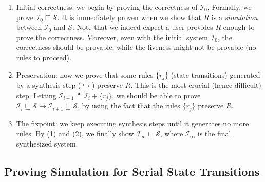 \documentclass[format=manuscript]{acmart}
\begin{document}
\begin{enumerate}
\item Initial correctness: we begin by proving the correctness of
  $\mathcal{I}_0$. Formally, we prove $\mathcal{I}_0 \sqsubseteq
  \mathcal{S}$. It is immediately proven when we show that $R$ is a
  \emph{simulation} between $\mathcal{I}_0$ and $\mathcal{S}$. Note that we
  indeed expect a user provides $R$ enough to prove the correctness. Moreover,
  even with the initial system $\mathcal{I}_0$, the correctness should be
  provable, while the liveness might not be provable (no rules to proceed).
\item Preservation: now we prove that some rules $\{ r_j \}$ (state transitions)
  generated by a synthesis step ($\hookrightarrow$) preserve $R$. This is the
  most crucial (hence difficult) step. Letting $\mathcal{I}_{i+1} \triangleq
  \mathcal{I}_i + \{ r_j \}$, we should be able to prove $\mathcal{I}_i
  \sqsubseteq \mathcal{S} \to \mathcal{I}_{i+1} \sqsubseteq \mathcal{S}$, by
  using the fact that the rules $\{ r_j \}$ preserve $R$.
\item The fixpoint: we keep executing synthesis steps until it generates no more
  rules. By (1) and (2), we finally show $\mathcal{I}_\infty \sqsubseteq
  \mathcal{S}$, where $\mathcal{I}_\infty$ is the final synthesized system.
\end{enumerate}

\subsection{Proving Simulation for Serial State Transitions}
\end{document}
